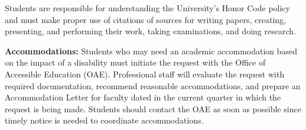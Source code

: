 \documentclass[11pt,letterpaper]{article}
\begin{document}
Students are responsible for understanding the University's Honor Code policy and must make proper use of citations of sources for writing papers, creating, presenting, and performing their work, taking examinations, and doing research.

\medskip
\noindent
\textbf{Accommodations:} Students who may need an academic accommodation based on the impact of a disability must initiate the request with the Office of Accessible Education (OAE). Professional staff will evaluate the request with required documentation, recommend reasonable accommodations, and prepare an Accommodation Letter for faculty dated in the current quarter in which the request is being made. Students should contact the OAE as soon as possible since timely notice is needed to coordinate accommodations.
\end{document}
